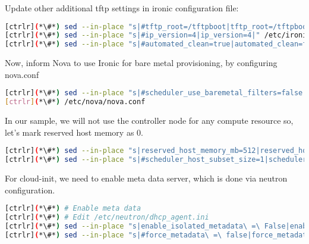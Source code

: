 	Update other additional tftp settings in ironic configuration file:


\begin{lstlisting}[language=bash,keywords={}]
[ctrlr](*\#*) sed --in-place "s|#tftp_root=/tftpboot|tftp_root=/tftpboot|" /etc/ironic/ironic.conf
[ctrlr](*\#*) sed --in-place "s|#ip_version=4|ip_version=4|" /etc/ironic/ironic.conf
[ctrlr](*\#*) sed --in-place "s|#automated_clean=true|automated_clean=false|" /etc/ironic/ironic.conf
\end{lstlisting} 

	Now, inform Nova to use Ironic for bare metal provisioning, by configuring nova.conf


\begin{lstlisting}[language=bash,keywords={}]
[ctrlr](*\#*) sed --in-place "s|#scheduler_use_baremetal_filters=false|scheduler_use_baremetal_filters=true|" \
[ctrlr](*\#*) /etc/nova/nova.conf
\end{lstlisting} 

	In our sample, we will not use the controller node for any compute resource so, let's mark reserved host memory as 0.


\begin{lstlisting}[language=bash,keywords={}]
[ctrlr](*\#*) sed --in-place "s|reserved_host_memory_mb=512|reserved_host_memory_mb=0|" /etc/nova/nova.conf
[ctrlr](*\#*) sed --in-place "s|#scheduler_host_subset_size=1|scheduler_host_subset_size=9999999|" /etc/nova/nova.conf
\end{lstlisting} 

	For cloud-init, we need to enable meta data server, which is done via neutron configuration.


\begin{lstlisting}[language=bash,keywords={}]
[ctrlr](*\#*) # Enable meta data
[ctrlr](*\#*) # Edit /etc/neutron/dhcp_agent.ini
[ctrlr](*\#*) sed --in-place "s|enable_isolated_metadata\ =\ False|enable_isolated_metadata\ =\ True|" /etc/neutron/dhcp_agent.ini
[ctrlr](*\#*) sed --in-place "s|#force_metadata\ =\ false|force_metadata\ =\ True|" \ /etc/neutron/dhcp_agent.ini
\end{lstlisting} 

